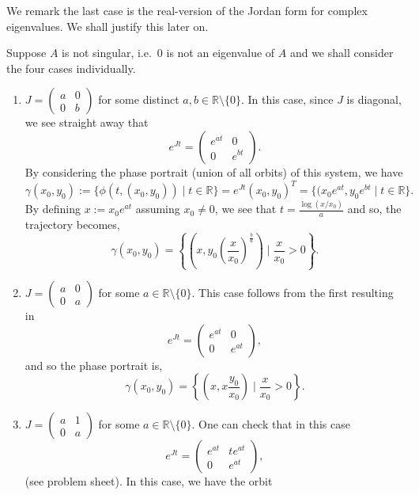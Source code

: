 \documentclass[
]{article}
\providecommand{\tightlist}{%
  \setlength{\itemsep}{0pt}\setlength{\parskip}{0pt}}
\theoremstyle{definition}
\theoremstyle{definition}
\begin{document}
We remark the last case is the real-version of the Jordan form for
complex eigenvalues. We shall justify this later on.

Suppose \(A\) is not singular, i.e.~0 is not an eigenvalue of \(A\) and
we shall consider the four cases individually.

\begin{enumerate}
\def\labelenumi{(\arabic{enumi})}
\tightlist
\item
  \(J = \begin{pmatrix}  a & 0 \\ 0 & b \end{pmatrix}\) for some
  distinct \(a, b \in \mathbb{R}\setminus \{0\}\). In this case, since
  \(J\) is diagonal, we see straight away that
  \[e^{Jt} = \begin{pmatrix}
    e^{at} & 0 \\ 0 & e^{bt}
  \end{pmatrix}.\] By considering the phase portrait (union of all
  orbits) of this system, we have
  \[\gamma(x_0, y_0) := \{\phi(t, (x_0, y_0)) \mid t \in \mathbb{R}\} 
  = e^{Jt}(x_0, y_0)^T = \{(x_0 e^{at}, y_0 e^{bt} \mid t \in \mathbb{R}\}.\]
  By defining \(x := x_0e^{at}\) assuming \(x_0 \neq 0\), we see that
  \(t = \frac{\log(x / x_0)}{a}\) and so, the trajectory becomes,
  \[\gamma(x_0, y_0) = \left\{\left(x, y_0\left(\frac{x}{x_0}\right)^{\frac{b}{a}}
  \right) \mid \frac{x}{x_0} > 0 \right\}.\]
\item
  \(J = \begin{pmatrix}  a & 0 \\ 0 & a \end{pmatrix}\) for some
  \(a \in \mathbb{R}\setminus \{0\}\). This case follows from the first
  resulting in \[e^{Jt} = \begin{pmatrix}
    e^{at} & 0 \\ 0 & e^{at}
  \end{pmatrix},\] and so the phase portrait is, \[\gamma(x_0, y_0) 
  = \left\{\left(x, x\frac{y_0}{x_0}\right) \mid \frac{x}{x_0} > 0\right\}.\]
\item
  \(J = \begin{pmatrix}  a & 1 \\ 0 & a \end{pmatrix}\) for some
  \(a \in \mathbb{R} \setminus\{0\}\). One can check that in this case
  \[e^{Jt} = \begin{pmatrix}
    e^{at} & te^{at} \\ 0 & e^{at}
  \end{pmatrix},\] (see problem sheet). In this case, we have the orbit

\end{enumerate}
\end{document}
